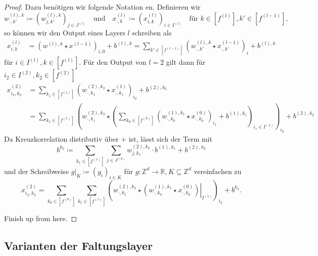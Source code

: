 \documentclass[paper=a4, 	%
		fontsize=11pt, 		%
		abstracton, 	%
		headsepline, 	%
		notitlepage	%
		]{scrartcl}
\theoremstyle{definition}
\newcommand{\R}{\mathbb{R}}
\newcommand{\Z}{\mathbb{Z}}
\newcommand{\todo}[1]{{\color{red} #1}}
\newcommand{\fNat}[1]{[ #1 ]}
\begin{document}
\begin{proof}
    \newcommand{\bcdot}{\boldsymbol{\cdot}}
    Dazu benötigen wir folgende Notation\todo{en}.
    Definieren wir \[
        w^{(l), k}_{\bcdot, k'}\coloneqq \left( w_{j,k'}^{(l),k}\right)_{j\in J^{(l)}}
        \quad \text{und} \quad
        x^{(l)}_{\bcdot, k} \coloneqq \left( x^{(l)}_{i,k} \right)_{i\in I^{(l)}}
        \quad \text{für $k\in \fNat{f^{(l)}}, k'\in\fNat{f^{(l-1)}}$},
    \]
    so können wir den Output eines Layers $l$ schreiben als 
    \begin{align*}
        x^{(l)}_{i, k}
        &=  \left( w^{(l),k} \star x^{(l-1)}\right)_{i,0} + b^{(l),k}
        = \sum_{k'\in \fNat{f^{(l-1)}}}  \left(w^{(l),k}_{\bcdot,k'} \star x^{(l-1)}_{\bcdot,k'} \right)_i + b^{(l),k}
    \end{align*}
    für $i\in I^{(l)}, k\in\fNat{f^{(l)}}$.
    Für den Output von $l=2$ gilt dann für $i_2\in I^{(2)}, k_2\in \fNat{f^{(2)}}$
    \begin{align*}
        x^{(2)}_{i_2,k_2}
        &= \sum_{k_1\in \fNat{f^{(1)}}}  \left(w^{(2),k_2}_{\bcdot,k_1} \star x^{(1)}_{\bcdot,k_1} \right)_{i_2} + b^{(2),k_2} \\
        &= \sum_{k_1\in \fNat{f^{(1)}}}  \left(w^{(2),k_2}_{\bcdot,k_1} \star \left( 
%
            \sum_{k_0\in \fNat{f^{(0)}}}  \left(w^{(1),k_1}_{\bcdot,k_0} \star x^{(0)}_{\bcdot,k_0} \right)_{i_1} + b^{(1),k_1}
%
         \right)_{i_1\in I^{(1)}} \right)_{i_2} + b^{(2),k_2}
    \end{align*}
    Da Kreuzkorrelation distributiv über $+$ ist, lässt sich der Term mit \[
        b^{k_2}\coloneqq \sum_{k_1\in\fNat{f^{(1)}}}\sum_{j\in J^{(2)}} w^{(2), k_2}_{j,k_1} \cdot b^{(1),k_1} + b^{(2), k_2}
    \]
    \newcommand{\rest}[2]{\left.{#1}\right|_{#2}}
    und der Schreibweise $\rest{g}{K} \coloneqq (g_i)_{i\in K}$ für $g: \Z^d \rightarrow \R, K\subseteq \Z^d$ vereinfachen zu 
    \[
        x^{(2)}_{i_2,k_2} 
        = \sum_{k_0\in \fNat{f^{(0)}}}\sum_{k_1\in \fNat{f^{(1)}}}  \left(w^{(2),k_2}_{\bcdot,k_1} \star 
        \rest{\left(w^{(1),k_1}_{\bcdot,k_0} \star x^{(0)}_{\bcdot,k_0} \right)}{I^{(1)}}
        \right)_{i_2} + b^{k_2}.
    \]

    \todo{Finish up from here.}
\end{proof}

\subsection{Varianten der Faltungslayer}
\end{document}
